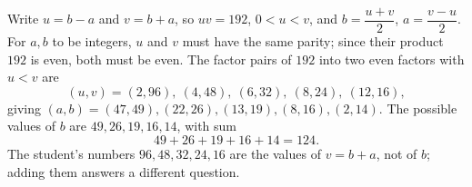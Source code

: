 Write $u=b-a$ and $v=b+a$, so $uv=192$, $0<u<v$, and $b=\dfrac{u+v}{2}$, $a=\dfrac{v-u}{2}$. For $a,b$ to be integers, $u$ and $v$ must have the same parity; since their product $192$ is even, both must be even. The factor pairs of $192$ into two even factors with $u<v$ are
\[
(u,v)=(2,96),\ (4,48),\ (6,32),\ (8,24),\ (12,16),
\]
giving $(a,b)=(47,49),(22,26),(13,19),(8,16),(2,14)$. The possible values of $b$ are $49,26,19,16,14$, with sum
\[
49+26+19+16+14=\boxed{124}.
\]
The student's numbers $96,48,32,24,16$ are the values of $v=b+a$, not of $b$; adding them answers a different question.
